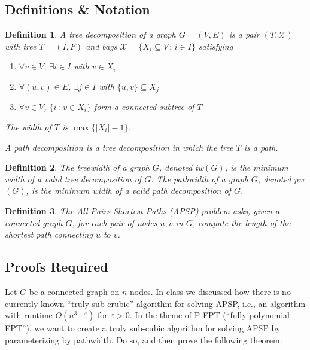 \documentclass{article}
\newtheorem{definition}{Definition}
\begin{document}
\subsection*{Definitions \& Notation}
\begin{definition}
    A \emph{tree decomposition} of a graph $G = (V,E)$
    is a pair $(T, \mathcal{X})$ with tree $T = (I,F)$
    and bags $\mathcal{X} = \{X_i \subseteq V \,:\, i \in I \}$
    satisfying
    \begin{enumerate}
      \item $\forall v \in V$, $\exists i \in I$ with $v \in X_i$
      \item $\forall (u,v) \in E$, $\exists j \in I$ with $\{u,v\} \subseteq X_j$
      \item $\forall v \in V$, $\{i \,:\, v \in X_i\}$ form a connected subtree of $T$
    \end{enumerate}
    The \emph{width} of $T$ is $\max\{|X_i| - 1\}$.

    A \emph{path decomposition} is a tree decomposition in which the tree $T$ is a path.
\end{definition}

\begin{definition} The \emph{treewidth} of a graph $G$, denoted tw$(G)$, is the minimum width of a valid tree decomposition of $G$. The \emph{pathwidth} of a graph $G$, denoted pw$(G)$, is the minimum width of a valid path decomposition of $G$.
\end{definition}


\begin{definition}
    The All-Pairs Shortest-Paths (\textsc{APSP}) problem asks, given a connected graph $G$, for each pair of nodes $u, v$ in $G$, compute the length of the shortest path connecting $u$ to $v$.
\end{definition}

\subsection*{Proofs Required}

Let $G$ be a connected graph on $n$ nodes. In class we discussed how there is no currently known ``truly sub-crubic'' algorithm for solving APSP, i.e., an algorithm with runtime $O(n^{3-\varepsilon})$ for $\varepsilon > 0$. In the theme of P-FPT (``fully polynomial FPT''), we want to create a truly sub-cubic algorithm for solving \textsc{APSP} by parameterizing by pathwidth. Do so, and then prove the following theorem:
\end{document}

